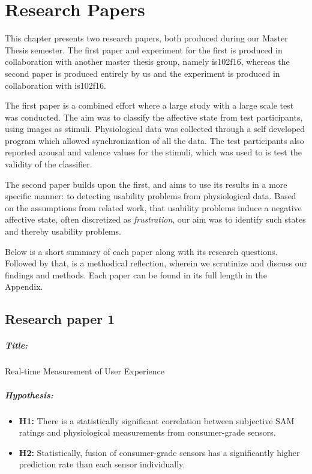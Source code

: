 \chapter{Research Papers}
This chapter presents two research papers, both produced during our Master
Thesis semester. The first paper and experiment for the first is produced in collaboration with another
master thesis group, namely is102f16, whereas the second paper is produced entirely by us and the experiment is produced in collaboration with is102f16.

The first paper is a combined effort where a large study with a large scale test was conducted.
The aim was to classify the affective state from test participants, using images as stimuli.
Physiological data was collected through a self developed program which allowed synchronization of all the data.
The test participants also reported arousal and valence values for the stimuli, which was used to is test the validity of the classifier.

The second paper builds upon the first, and aims to use its results in a more
specific manner: to detecting usability problems from physiological
data. Based on the assumptions from related work, that usability problems
induce a negative affective state, often discretized as \textit{frustration},
our aim was to identify such states and thereby usability problems.

Below is a short summary of each paper along with its research questions.
Followed by that, is a methodical reflection, wherein we scrutinize and discuss
our findings and methods. Each paper can be found in its full length in the
Appendix.

\section{Research paper 1}
\paragraph{Title:}
Real-time Measurement of User Experience
\paragraph{Hypothesis:}
\begin{itemize}
    \item \textbf{H1:} There is a statistically significant
      correlation between subjective SAM ratings and physiological
      measurements from consumer-grade sensors.
    \item \textbf{H2:} Statistically, fusion of consumer-grade sensors
      has a significantly higher prediction rate than each sensor
      individually.
\end{itemize}
